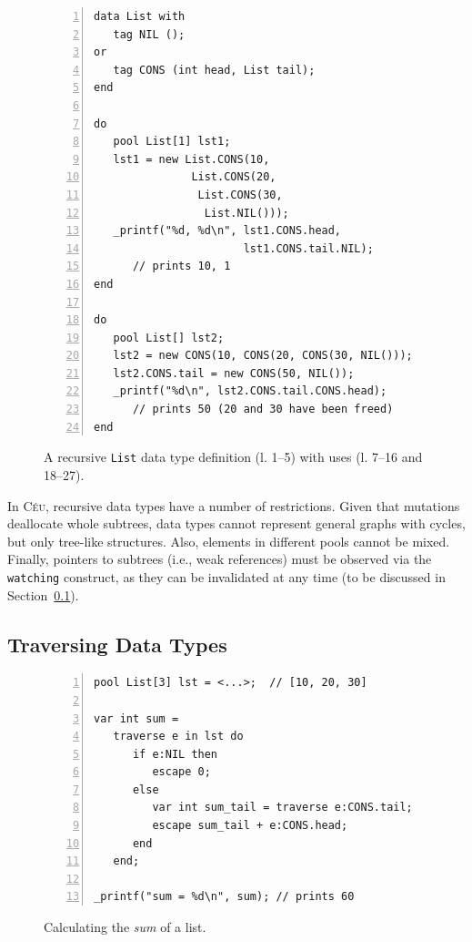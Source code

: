 \documentclass{sig-alternate}
\newcommand{\CEU}{\textsc{C\'{e}u}\xspace}
\newcommand{\code}[1] {{\small{\texttt{#1}}}}
\begin{document}

\begin{figure}[t]
\begin{lstlisting}[numbers=left,xleftmargin=3em]
data List with
   tag NIL ();
or
   tag CONS (int head, List tail);
end

do
   pool List[1] lst1;
   lst1 = new List.CONS(10,
               List.CONS(20,
                List.CONS(30,
                 List.NIL()));
   _printf("%d, %d\n", lst1.CONS.head,
                       lst1.CONS.tail.NIL);
      // prints 10, 1
end

do
   pool List[] lst2;
   lst2 = new CONS(10, CONS(20, CONS(30, NIL()));
   lst2.CONS.tail = new CONS(50, NIL());
   _printf("%d\n", lst2.CONS.tail.CONS.head);
      // prints 50 (20 and 30 have been freed)
end
\end{lstlisting}
\caption{
A recursive \code{List} data type definition (l. 1--5) with uses (l. 
7--16 and 18--27).
\label{lst.list}
}
\end{figure}

In \CEU, recursive data types have a number of restrictions.
Given that mutations deallocate whole subtrees, data types cannot represent 
general graphs with cycles, but only tree-like structures.
Also, elements in different pools cannot be mixed.
Finally, pointers to subtrees (i.e., weak references) must be observed via the
\code{watching} construct, as they can be invalidated at any time
(to be discussed in Section~\ref{sec.traverse}).


\subsection{Traversing Data Types}
\label{sec.traverse}

\begin{figure}[t]
\begin{lstlisting}[numbers=left,xleftmargin=3em]
pool List[3] lst = <...>;  // [10, 20, 30]

var int sum =
   traverse e in lst do
      if e:NIL then
         escape 0;
      else
         var int sum_tail = traverse e:CONS.tail;
         escape sum_tail + e:CONS.head;
      end
   end;

_printf("sum = %d\n", sum); // prints 60
\end{lstlisting}
\caption{
Calculating the \emph{sum} of a list.
\label{lst.list.sum}
}
\end{figure}
\end{document}
